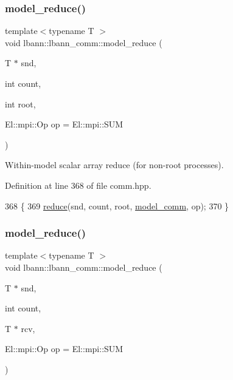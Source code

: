 \subsubsection{\texorpdfstring{model\+\_\+reduce()}{model\_reduce()}\hspace{0.1cm}{\footnotesize\ttfamily [3/4]}}
{\footnotesize\ttfamily template$<$typename T $>$ \\
void lbann\+::lbann\+\_\+comm\+::model\+\_\+reduce (\begin{DoxyParamCaption}\item[{T $\ast$}]{snd,  }\item[{int}]{count,  }\item[{int}]{root,  }\item[{El\+::mpi\+::\+Op}]{op = {\ttfamily El\+:\+:mpi\+:\+:SUM} }\end{DoxyParamCaption})\hspace{0.3cm}{\ttfamily [inline]}}

Within-\/model scalar array reduce (for non-\/root processes). 

Definition at line 368 of file comm.\+hpp.


\begin{DoxyCode}
368                                                                         \{
369     \hyperlink{classlbann_1_1lbann__comm_ab8a2261394c978aa7e4b74ecebc739a8}{reduce}(snd, count, root, \hyperlink{classlbann_1_1lbann__comm_a58a75b76bd61ec8a26c1cbbec3dc2f45}{model\_comm}, op);
370   \}
\end{DoxyCode}
\mbox{\label{classlbann_1_1lbann__comm_aba37a188f88277b23583aa8bea2e2f04}} 
\subsubsection{\texorpdfstring{model\+\_\+reduce()}{model\_reduce()}\hspace{0.1cm}{\footnotesize\ttfamily [4/4]}}
{\footnotesize\ttfamily template$<$typename T $>$ \\
void lbann\+::lbann\+\_\+comm\+::model\+\_\+reduce (\begin{DoxyParamCaption}\item[{T $\ast$}]{snd,  }\item[{int}]{count,  }\item[{T $\ast$}]{rcv,  }\item[{El\+::mpi\+::\+Op}]{op = {\ttfamily El\+:\+:mpi\+:\+:SUM} }\end{DoxyParamCaption})\hspace{0.3cm}{\ttfamily [inline]}}


